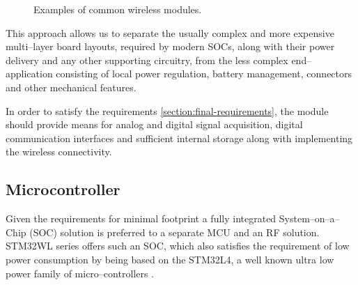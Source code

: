\begin{figure}
    \centering
    \caption{\label{fig:wireless-modules}Examples of common wireless modules.}
\end{figure}

This approach allows us to separate the usually complex and more expensive multi--layer board layouts, required by modern SOCs, along with their power delivery and any other supporting circuitry, from the less complex end--application consisting of local power regulation, battery management, connectors and other mechanical features.

In order to satisfy the requirements \ref{section:final-requirements}, the module should provide means for analog and digital signal acquisition, digital communication interfaces and sufficient internal storage along with implementing the wireless connectivity.

\subsection{\label{section:mcu}Microcontroller}
Given the requirements for minimal footprint a fully integrated System--on--a--Chip (SOC) solution is preferred to a separate MCU and an RF solution. STM32WL series offers such an SOC, which also satisfies the requirement of low power consumption by being based on the STM32L4, a well known ultra low power family of micro--controllers \cite{stmicroelectronics_stm32wle5xx_nodate}.

